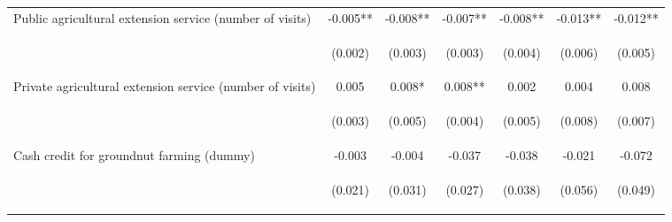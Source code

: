 \begin{center}
\begin{tabular}{lcccccc}
Public agricultural extension service (number of visits) & -0.005** & -0.008** & -0.007** & -0.008** & -0.013** & -0.012** \\
\vspace{4pt} & \begin{footnotesize}(0.002)\end{footnotesize} & \begin{footnotesize}(0.003)\end{footnotesize} & \begin{footnotesize}(0.003)\end{footnotesize} & \begin{footnotesize}(0.004)\end{footnotesize} & \begin{footnotesize}(0.006)\end{footnotesize} & \begin{footnotesize}(0.005)\end{footnotesize} \\
Private agricultural extension service (number of visits) & 0.005 & 0.008* & 0.008** & 0.002 & 0.004 & 0.008 \\
\vspace{4pt} & \begin{footnotesize}(0.003)\end{footnotesize} & \begin{footnotesize}(0.005)\end{footnotesize} & \begin{footnotesize}(0.004)\end{footnotesize} & \begin{footnotesize}(0.005)\end{footnotesize} & \begin{footnotesize}(0.008)\end{footnotesize} & \begin{footnotesize}(0.007)\end{footnotesize} \\
Cash credit for groundnut farming (dummy) & -0.003 & -0.004 & -0.037 & -0.038 & -0.021 & -0.072 \\
\vspace{4pt} & \begin{footnotesize}(0.021)\end{footnotesize} & \begin{footnotesize}(0.031)\end{footnotesize} & \begin{footnotesize}(0.027)\end{footnotesize} & \begin{footnotesize}(0.038)\end{footnotesize} & \begin{footnotesize}(0.056)\end{footnotesize} & \begin{footnotesize}(0.049)\end{footnotesize} \\

\end{tabular}
\end{center}
